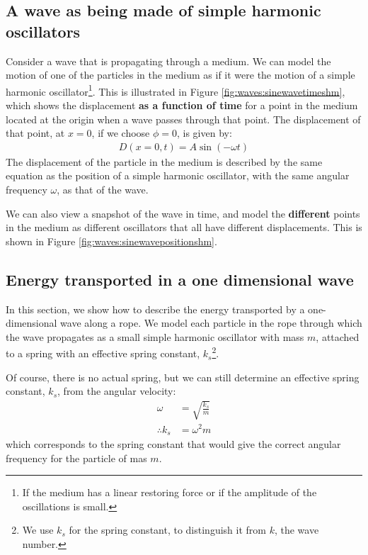 \subsection{A wave as being made of simple harmonic oscillators}
Consider a wave that is propagating through a medium. We can model the motion of one of the particles in the medium as if it were the motion of a simple harmonic oscillator\footnote{If the medium has a linear restoring force or if the amplitude of the oscillations is small.}. This is illustrated in Figure \ref{fig:waves:sinewavetimeshm}, which shows the displacement \textbf{as a function of time} for a point in the medium located at the origin when a wave passes through that point. The displacement of that point, at $x=0$, if we choose $\phi=0$, is given by:
\begin{align*}
D(x=0,t) = A\sin(-\omega t)
\end{align*}
The displacement of the particle in the medium is described by the same equation as the position of a simple harmonic oscillator, with the same angular frequency $\omega$, as that of the wave. 

We can also view a snapshot of the wave in time, and model the \textbf{different} points in the medium as different oscillators that all have different displacements. This is shown in Figure \ref{fig:waves:sinewavepositionshm}.

\subsection{Energy transported in a one dimensional wave}
In this section, we show how to describe the energy transported by a one-dimensional wave along a rope. We model each particle in the rope through which the wave propagates as a small simple harmonic oscillator with mass $m$, attached to a spring with an effective spring constant, $k_s$\footnote{We use $k_s$ for the spring constant, to distinguish it from $k$, the wave number.}.

Of course, there is no actual spring, but we can still determine an effective spring constant, $k_s$, from the angular velocity:
\begin{align*}
\omega &= \sqrt{\frac{k_s}{m}}\\
\therefore k_s &= \omega^2 m
\end{align*}
which corresponds to the spring constant that would give the correct angular frequency for the particle of mas $m$.

